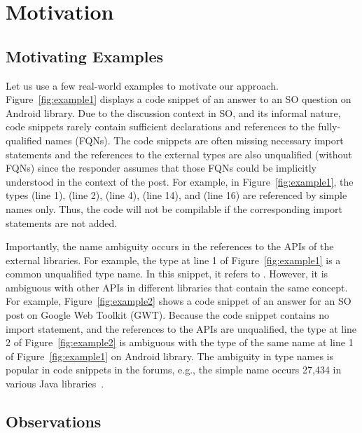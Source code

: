 \section{Motivation}
\label{motiv:sec}

\subsection{Motivating Examples}
\label{examples:sec}



Let us use a few real-world examples to motivate our approach.
Figure~\ref{fig:example1} displays a code snippet of an answer to an
SO question on Android library. Due to the discussion context in SO,
and its informal nature, code snippets rarely contain sufficient
declarations and references to the fully-qualified names (FQNs). The
code snippets are often missing necessary import statements and the
references to the external types are also unqualified (without
FQNs) since the responder assumes that those FQNs could be implicitly
understood in the context of the post. For example, in
Figure~\ref{fig:example1}, the types  (line 1),
 (line 2),  (line 4),  (line
14), and  (line 16) are referenced by simple names
only. Thus, the code will not be compilable if the corresponding
import statements are not added.



Importantly, the name ambiguity occurs in the references to the APIs
of the external libraries. For example, the type  at line
1 of Figure~\ref{fig:example1} is a common unqualified type name. In
this snippet, it refers to . However, it
is ambiguous with other APIs in different libraries that
contain the same concept. For example, Figure~\ref{fig:example2} shows
a code snippet of an answer for an SO post on Google Web Toolkit
(GWT). Because the code snippet contains no import statement, and the
references to the APIs are unqualified, the type  at line
2 of Figure~\ref{fig:example2} is ambiguous with the type of the same
name at line 1 of Figure~\ref{fig:example1} on Android library. The
ambiguity in type names is popular in code snippets in the forums,
e.g., the simple name  occurs 27,434 in various Java
libraries~\cite{liveapi14}.

\subsection{Observations}
\label{sec:obs}

